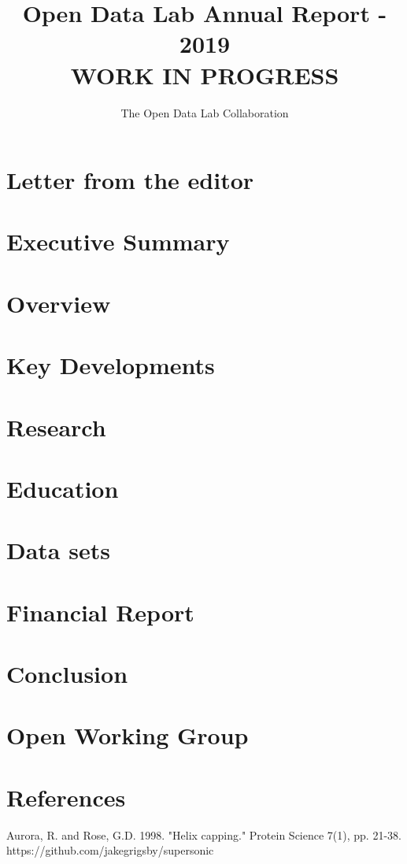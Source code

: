 \documentclass[12pt,letterpaper]{report} %
\title{Open Data Lab Annual Report - 2019\\
\large WORK IN PROGRESS}
\author{The Open Data Lab Collaboration}
\begin{document}
\maketitle
\chapter*{Letter from the editor}   %
\chapter{Executive Summary}
\tableofcontents
\chapter{Overview} 
\chapter{Key Developments} 
\chapter{Research} 
\chapter{Education} 
\chapter{Data sets} 	
\chapter{Financial Report} 
\chapter{Conclusion}

\appendix
\chapter{Open Working Group}\label{chap:owg}
 

\chapter{References}
\begin{thebibliography}{99}
 Aurora, R. and Rose, G.D. 1998. "Helix capping." Protein Science 7(1), pp. 21-38.
 https://github.com/jakegrigsby/supersonic
\end{thebibliography}
\end{document}
